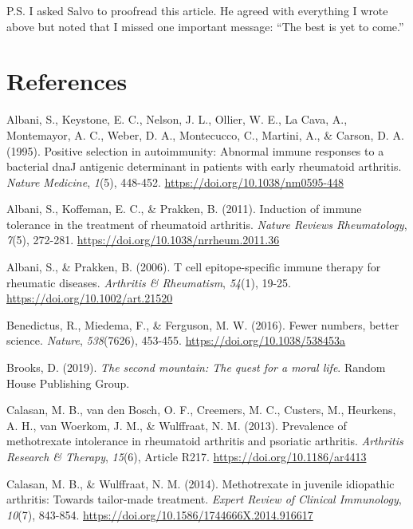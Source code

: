 \documentclass[authordate, editorial]{jote-new-article}
\begin{document}
	P.S. I asked Salvo to proofread this article. He agreed with everything I wrote above but noted that I missed one important message: “The best is yet to come.”



	\section{References}



	Albani, S., Keystone, E. C., Nelson, J. L., Ollier, W. E., La Cava, A., Montemayor, A. C., Weber, D. A., Montecucco, C., Martini, A., \& Carson, D. A. (1995). Positive selection in autoimmunity: Abnormal immune responses to a bacterial dnaJ antigenic determinant in patients with early rheumatoid arthritis. \emph{Nature Medicine},\emph{ 1}(5), 448-452. \url{https://doi.org/10.1038/nm0595-448}



	Albani, S., Koffeman, E. C., \& Prakken, B. (2011). Induction of immune tolerance in the treatment of rheumatoid arthritis. \emph{Nature Reviews Rheumatology},\emph{ 7}(5), 272-281. \url{https://doi.org/10.1038/nrrheum.2011.36}



	Albani, S., \& Prakken, B. (2006). T cell epitope-specific immune therapy for rheumatic diseases. \emph{Arthritis \& Rheumatism},\emph{ 54}(1), 19-25. \url{https://doi.org/10.1002/art.21520}



	Benedictus, R., Miedema, F., \& Ferguson, M. W. (2016). Fewer numbers, better science. \emph{Nature},\emph{ 538}(7626), 453-455. \url{https://doi.org/10.1038/538453a}



	Brooks, D. (2019). \emph{The second mountain: The quest for a moral life}. Random House Publishing Group.



	Calasan, M. B., van den Bosch, O. F., Creemers, M. C., Custers, M., Heurkens, A. H., van Woerkom, J. M., \& Wulffraat, N. M. (2013). Prevalence of methotrexate intolerance in rheumatoid arthritis and psoriatic arthritis. \emph{Arthritis Research \& Therapy},\emph{ 15}(6), Article R217. \url{https://doi.org/10.1186/ar4413}



	Calasan, M. B., \& Wulffraat, N. M. (2014). Methotrexate in juvenile idiopathic arthritis: Towards tailor-made treatment. \emph{Expert Review of Clinical Immunology},\emph{ 10}(7), 843-854. \url{https://doi.org/10.1586/1744666X.2014.916617}
\end{document}
